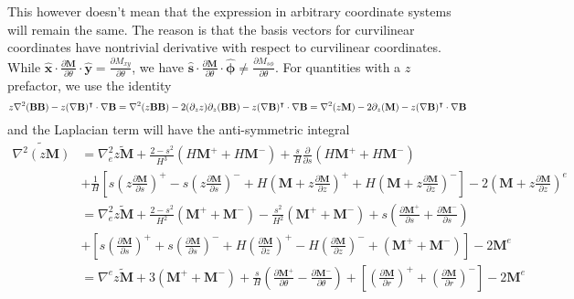 This however doesn't mean that the expression in arbitrary coordinate systems will remain the same. The reason is that the basis vectors for curvilinear coordinates have nontrivial derivative with respect to curvilinear coordinates. While $\hat{\mathbf{x}}\cdot \frac{\partial \mathbf{M}}{\partial \theta} \cdot \hat{\mathbf{y}} = \frac{\partial M_{xy}}{\partial \theta}$, we have $\hat{\mathbf{s}}\cdot \frac{\partial \mathbf{M}}{\partial \theta} \cdot \hat{\mathbf{\phi}} \neq \frac{\partial M_{s\phi}}{\partial \theta}$. For quantities with a $z$ prefactor, we use the identity
\[
    z \nabla^2 (\mathbf{B}\mathbf{B}) - z (\nabla \mathbf{B})^\intercal \cdot \nabla \mathbf{B} = \nabla^2 (z \mathbf{B}\mathbf{B}) - 2 (\partial_z z) \partial_z (\mathbf{B}\mathbf{B}) - z (\nabla \mathbf{B})^\intercal \cdot \nabla \mathbf{B} = \nabla^2 (z \mathbf{M}) - 2 \partial_z (\mathbf{M}) - z (\nabla \mathbf{B})^\intercal \cdot \nabla \mathbf{B} \\ 
\]
and the Laplacian term will have the anti-symmetric integral
\[\begin{aligned}
    \widetilde{\nabla^2 (z\mathbf{M})} &= \nabla_e^2 \widetilde{z\mathbf{M}} + \frac{2 - s^2}{H^3} \left(H \mathbf{M}^+ + H \mathbf{M}^-\right) + \frac{s}{H} \frac{\partial}{\partial s} \left(H \mathbf{M}^+ + H \mathbf{M}^-\right) \\
    &+ \frac{1}{H} \left[s \left(z\frac{\partial \mathbf{M}}{\partial s}\right)^+ - s \left(z\frac{\partial \mathbf{M}}{\partial s}\right)^- + H \left(\mathbf{M} + z\frac{\partial \mathbf{M}}{\partial z}\right)^+ + H \left(\mathbf{M} + z\frac{\partial \mathbf{M}}{\partial z}\right)^-\right] - 2 \left(\mathbf{M} + z\frac{\partial \mathbf{M}}{\partial z}\right)^e \\ 
    &= \nabla_e^2 \widetilde{z\mathbf{M}} + \frac{2 - s^2}{H^2} \left(\mathbf{M}^+ + \mathbf{M}^-\right) - \frac{s^2}{H^2} \left(\mathbf{M}^+ + \mathbf{M}^-\right) + s \left(\frac{\partial \mathbf{M}^+}{\partial s} + \frac{\partial \mathbf{M}^-}{\partial s}\right) \\
    &+ \left[s \left(\frac{\partial \mathbf{M}}{\partial s}\right)^+ + s \left(\frac{\partial \mathbf{M}}{\partial s}\right)^- + H \left(\frac{\partial \mathbf{M}}{\partial z}\right)^+ - H \left(\frac{\partial \mathbf{M}}{\partial z}\right)^- + \left(\mathbf{M}^+ + \mathbf{M}^-\right)\right] - 2 \mathbf{M}^e \\ 
    &= \nabla^e \widetilde{z\mathbf{M}} + 3 (\mathbf{M}^+ + \mathbf{M}^-) + \frac{s}{H} \left(\frac{\partial \mathbf{M}^+}{\partial \theta} - \frac{\partial \mathbf{M}^-}{\partial \theta}\right) + \left[\left(\frac{\partial \mathbf{M}}{\partial r}\right)^+ + \left(\frac{\partial \mathbf{M}}{\partial r}\right)^-\right] - 2 \mathbf{M}^e
\end{aligned}\]
